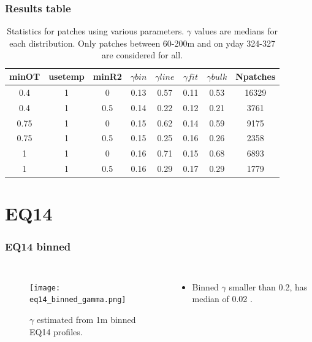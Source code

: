 \documentclass{beamer}
\begin{document}
\begin{frame}
 \frametitle{Results table}


\begin{table}[htdp]
\caption{Statistics for patches using various parameters. $\gamma$ values are medians for each distribution. Only patches between 60-200m and on yday 324-327 are considered for all.}
\begin{center}
\begin{tabular}{|c|c|c|c|c|c|c|c|}
\hline
minOT & usetemp & minR2 & $\gamma bin$ & $\gamma line$ & $\gamma fit$ & $\gamma bulk$ & Npatches \\
\hline
0.4 & 1 & 0 & 0.13 & 0.57 & 0.11 & 0.53 & 16329 \\
\hline
0.4 & 1 & 0.5 & 0.14 & 0.22 & 0.12 & 0.21 & 3761 \\
\hline
0.75 & 1 & 0 & 0.15 & 0.62 & 0.14 & 0.59 & 9175 \\
\hline
0.75 & 1 & 0.5 & 0.15 & 0.25 & 0.16 & 0.26 & 2358 \\
\hline
1 & 1 & 0 & 0.16 & 0.71 & 0.15 & 0.68 & 6893 \\
\hline
1 & 1 & 0.5 & 0.16 & 0.29 & 0.17 & 0.29 & 1779 \\
\hline
\hline
\hline
\end{tabular}
\end{center}
\label{tab}
\end{table}%


\end{frame}




\section{EQ14}

\begin{frame}
 \frametitle{EQ14 binned}


\begin{columns}
\begin{figure}[htbp]
\begin{center}
\texttt{[image: eq14\_binned\_gamma.png]}
\caption{$\gamma$ estimated from 1m binned EQ14 profiles.}
\label{default}
\end{center}
\end{figure}

\begin{itemize}
\item Binned $\gamma$ smaller than 0.2, has median of 0.02 .
\end{itemize}

\end{columns}

\end{frame}
\end{document}
